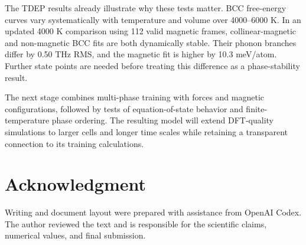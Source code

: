 \documentclass[conference]{IEEEtran}
\begin{document}
The TDEP results already illustrate why these tests matter. BCC free-energy curves vary systematically with temperature and volume over 4000--6000 K. In an updated 4000 K comparison using 112 valid magnetic frames, collinear-magnetic and non-magnetic BCC fits are both dynamically stable. Their phonon branches differ by 0.50 THz RMS, and the magnetic fit is higher by 10.3 meV/atom. Further state points are needed before treating this difference as a phase-stability result.

The next stage combines multi-phase training with forces and magnetic configurations, followed by tests of equation-of-state behavior and finite-temperature phase ordering. The resulting model will extend DFT-quality simulations to larger cells and longer time scales while retaining a transparent connection to its training calculations.

\section*{Acknowledgment}
Writing and document layout were prepared with assistance from OpenAI Codex. The author reviewed the text and is responsible for the scientific claims, numerical values, and final submission.
\end{document}
